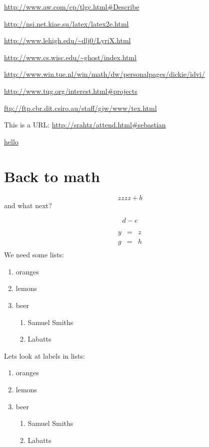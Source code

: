 \documentclass[11pt]{book}
\begin{document}
\begin{minipage}{1.5in}
\url{http://www.aw.com/cp/tlgc.html#Describe}

\url{http://nsi.net.kiae.su/latex/latex2e.html}

\url{http://www.lehigh.edu/~dlj0/LyriX.html}

\url{http://www.cs.wisc.edu/~ghost/index.html}

\url{http://www.win.tue.nl/win/math/dw/personalpages/dickie/idvi/}

\url{http://www.tug.org/interest.html#projects}

\url{ftp://ftp.cbr.dit.csiro.au/staff/gjw/www/tex.html}


This is a URL: \url{http://srahtz/attend.html#sebastian}

\hyperref{file:test2.pdf}{equation}{1}{hello}
\end{minipage}

\newpage

\section{Back to math}
\begin{equation}
  zzzz + b
  \label{eq1}
\end{equation}
and what next?

\begin{equation}
  d - e
  \label{eq2}
\end{equation}

\begin{eqnarray}
  y &=&z\\
  g &=&h\\
  \label{eq3}
\end{eqnarray}
We need some lists:
\begin{enumerate}
\item oranges
\item lemons
\item beer
  \begin{enumerate}
  \item Samuel Smiths
  \item Labatts
  \end{enumerate}
\end{enumerate}

Lets look at labels in lists:
\begin{enumerate}
\item oranges\label{oranges}
\item lemons\label{lemons}
\item beer\label{beer}
  \begin{enumerate}
  \item Samuel Smiths\label{smiths}
  \item Labatts\label{labatts}
  \end{enumerate}
\end{enumerate}
\clearpage
\end{document}
